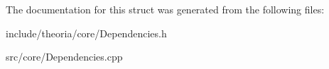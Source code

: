 The documentation for this struct was generated from the following files\+:\begin{DoxyCompactItemize}
\item 
include/theoria/core/Dependencies.\+h\item 
src/core/Dependencies.\+cpp\end{DoxyCompactItemize}
